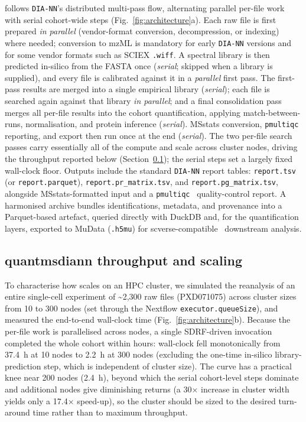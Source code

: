 \quantmsdiann{} follows \texttt{DIA-NN}'s distributed multi-pass flow, alternating parallel per-file work with serial cohort-wide steps (Fig.~\ref{fig:architecture}a). Each raw file is first prepared \emph{in parallel} (vendor-format conversion, decompression, or indexing) where needed; conversion to mzML is mandatory for early \texttt{DIA-NN} versions and for some vendor formats such as SCIEX \texttt{.wiff}. A spectral library is then predicted in-silico from the FASTA once (\emph{serial}; skipped when a library is supplied), and every file is calibrated against it in a \emph{parallel} first pass. The first-pass results are merged into a single empirical library (\emph{serial}); each file is searched again against that library \emph{in parallel}; and a final consolidation pass merges all per-file results into the cohort quantification, applying match-between-runs, normalisation, and protein inference (\emph{serial}). MSstats conversion, \texttt{pmultiqc} reporting, and \qpx{} export then run once at the end (\emph{serial}). The two per-file search passes carry essentially all of the compute and scale across cluster nodes, driving the throughput reported below (Section~\ref{sec:throughput}); the serial steps set a largely fixed wall-clock floor.
Outputs include the standard \texttt{DIA-NN} report tables: \texttt{report.tsv} (or \texttt{report.parquet}), \texttt{report.pr\_matrix.tsv}, and \texttt{report.pg\_matrix.tsv}, alongside MSstats-formatted input and a \texttt{pmultiqc}~\cite{larrea2025pmultiqc} quality-control report.
A harmonised \qpx{} archive bundles identifications, metadata, and provenance into a Parquet-based artefact, queried directly with DuckDB and, for the quantification layers, exported to MuData (\texttt{.h5mu}) for scverse-compatible~\cite{virshup2023scverse} downstream analysis.

\subsection{quantmsdiann throughput and scaling}
\label{sec:throughput}

To characterise how \quantmsdiann{} scales on an HPC cluster, we simulated the reanalysis of an entire single-cell experiment of \textasciitilde 2{,}300 raw files (PXD071075) across cluster sizes from 10 to 300 nodes (set through the Nextflow \texttt{executor.queueSize}), and measured the end-to-end wall-clock time (Fig.~\ref{fig:architecture}b). Because the per-file work is parallelised across nodes, a single SDRF-driven invocation completed the whole cohort within hours: wall-clock fell monotonically from 37.4~h at 10 nodes to 2.2~h at 300 nodes (excluding the one-time in-silico library-prediction step, which is independent of cluster size). The curve has a practical knee near 200 nodes (2.4~h), beyond which the serial cohort-level steps dominate and additional nodes give diminishing returns (a 30$\times$ increase in cluster width yields only a 17.4$\times$ speed-up), so the cluster should be sized to the desired turn-around time rather than to maximum throughput.

